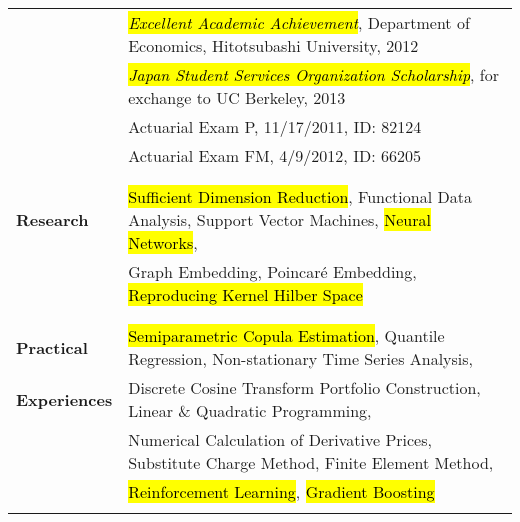 \documentclass[utf8,letterpaper,oneside]{article}
\begin{document}
\begin{center}
\begin{tabular}{l l}
                           & \hl{\textit{Excellent Academic Achievement}}, Department of Economics, Hitotsubashi University, 2012          \\
  
                           & \hl{\textit{Japan Student Services Organization Scholarship}}, for exchange to UC Berkeley, 2013              \\
                           & Actuarial Exam P, 11/17/2011, ID: 82124                                                                       \\
                           & Actuarial Exam FM, 4/9/2012, ID: 66205                                                                        \\
                           &                                                                                                               \\ \hline
                           &                                                                                                               \\
  \textbf{Research}        & \hl{Sufficient Dimension Reduction}, Functional Data Analysis, Support Vector Machines, \hl{Neural Networks}, \\
                           & Graph Embedding, Poincar\'e Embedding, \hl{Reproducing Kernel Hilber Space}                                   \\
                           &                                                                                                               \\ \hline
                           &                                                                                                               \\
  \textbf{Practical}       & \hl{Semiparametric Copula Estimation}, Quantile Regression, Non-stationary Time Series Analysis,   \\
  \textbf{Experiences}     & Discrete Cosine Transform Portfolio Construction, Linear \& Quadratic Programming,                            \\
                           & Numerical Calculation of Derivative Prices, Substitute Charge Method, Finite Element Method,                  \\
                           & \hl{Reinforcement Learning}, \hl{Gradient Boosting}                                                           \\
                           &                                                                                                               \\ \hline

\end{tabular}
\end{center}
\end{document}
